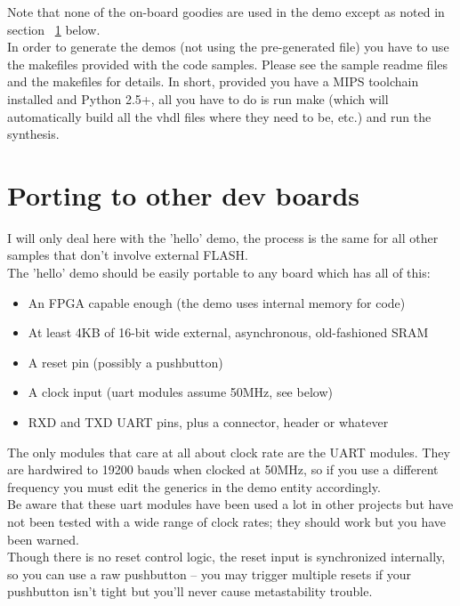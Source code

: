     Note that none of the on-board goodies are used in the demo except as noted
    in section ~\ref{porting_hw_demo} below.\\

    In order to generate the demos (not using the pre-generated file) you
    have to use the makefiles provided with the code samples. Please see 
    the sample readme files and the makefiles for details. In short, provided
    you have a MIPS toolchain installed and Python 2.5+, all you have to do
    is run make (which will automatically build all the vhdl files where they
    need to be, etc.) and run the synthesis.\\
    

\section{Porting to other dev boards}
\label{porting_hw_demo}

    I will only deal here with the 'hello' demo, the process is the same
    for all other samples that don't involve external FLASH.\\

    The 'hello' demo should be easily portable to any board which has all of 
    this:

    \begin{itemize}
    \item An FPGA capable enough (the demo uses internal memory for code)
    \item At least 4KB of 16-bit wide external, asynchronous, old-fashioned SRAM
    \item A reset pin (possibly a pushbutton)
    \item A clock input (uart modules assume 50MHz, see below)
    \item RXD and TXD UART pins, plus a connector, header or whatever
    \end{itemize}

    The only modules that care at all about clock rate are the UART
    modules. They are hardwired to 19200 bauds when clocked at 50MHz, so if you
    use a different frequency you must edit the generics in the demo entity
    accordingly.\\
    Be aware that these uart modules have been used a lot in other projects but 
    have not been tested with a wide range of clock rates; they should work but 
    you have been warned.\\

    Though there is no reset control logic, the reset input is synchronized 
    internally, so you can use a raw pushbutton -- you may trigger multiple 
    resets if your pushbutton isn't tight but you'll never cause metastability 
    trouble.\\

